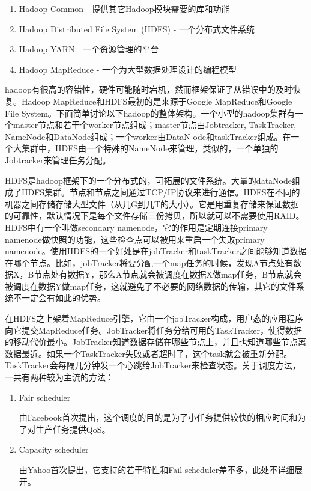 \begin{enumerate}
\item Hadoop Common - 提供其它Hadoop模块需要的库和功能
\item Hadoop Distributed File System (HDFS) - 一个分布式文件系统
\item Hadoop YARN - 一个资源管理的平台
\item Hadoop MapReduce - 一个为大型数据处理设计的编程模型
\end{enumerate}
hadoop有很高的容错性，硬件可能随时宕机，然而框架保证了从错误中的及时恢复。Hadoop MapReduce和HDFS最初的是来源于Google MapReduce和Google File System。下面简单讨论以下hadoop的整体架构。一个小型的hadoop集群有一个master节点和若干个worker节点组成；master节点由Jobtracker, TaskTracker, NameNode和DataNode组成；一个worker由DataN
ode和taskTracker组成。在一个大集群中，HDFS由一个特殊的NameNode来管理，类似的，一个单独的Jobtracker来管理任务分配。

HDFS是hadoop框架下的一个分布式的，可拓展的文件系统。大量的dataNode组成了HDFS集群。节点和节点之间通过TCP/IP协议来进行通信。HDFS在不同的机器之间存储存储大型文件（从几G到几T的大小）。它是用重复存储来保证数据的可靠性，默认情况下是每个文件存储三份拷贝，所以就可以不需要使用RAID。HDFS中有一个叫做secondary namenode，它的作用是定期连接primary namenode做快照的功能，这些检查点可以被用来重启一个失败primary namenode。使用HDFS的一个好处是在jobTracker和taskTracker之间能够知道数据在哪个节点。比如，jobTracker将要分配一个map任务的时候，发现A节点处有数据X，B节点处有数据Y，那么A节点就会被调度在数据X做map任务，B节点就会被调度在数据Y做map任务，这就避免了不必要的网络数据的传输，其它的文件系统不一定会有如此的优势。

在HDFS之上架着MapReduce引擎，它由一个jobTracker构成，用户态的应用程序向它提交MapReduce任务。JobTracker将任务分给可用的TaskTracker，使得数据的移动代价最小。JobTracker知道数据存储在哪些节点上，并且也知道哪些节点离数据最近。如果一个TaskTracker失败或者超时了，这个task就会被重新分配。TaskTracker会每隔几分钟发一个心跳给JobTracker来检查状态。关于调度方法，一共有两种较为主流的方法：

\begin{enumerate}
\item Fair scheduler

由Facebook首次提出，这个调度的目的是为了小任务提供较快的相应时间和为了对生产任务提供QoS。
\item Capacity scheduler

由Yahoo首次提出，它支持的若干特性和Fail scheduler差不多，此处不详细展开。
\end{enumerate}


